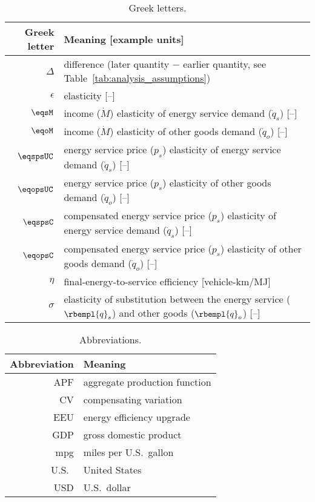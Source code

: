 
\begin{table}
\centering %
\caption{Greek letters.}
\begin{tabular}{r l}
  \toprule
  Greek letter & Meaning [example units] \\
  \midrule
  $\Delta$   & difference (later quantity $-$ earlier quantity, see Table~\ref{tab:analysis_assumptions}) \\
  $\epsilon$ & elasticity [--] \\
  $\eqsM$    & income ($\dot{M}$) elasticity of energy service demand ($\dot{q}_s$) [--] \\
  $\eqoM$    & income ($\dot{M}$) elasticity of other goods demand ($\dot{q}_o$) [--] \\
  $\eqspsUC$ & energy service price ($p_s$) elasticity of energy service demand ($\dot{q}_s$) [--] \\
  $\eqopsUC$ & energy service price ($p_s$) elasticity of other goods demand ($\dot{q}_o$) [--] \\
  $\eqspsC$   & compensated energy service price ($p_s$) elasticity of energy service demand ($\dot{q}_s$) [--] \\
  $\eqopsC$   & compensated energy service price ($p_s$) elasticity of other goods demand ($\dot{q}_o$) [--] \\
  $\eta$     & final-energy-to-service efficiency [vehicle-km/MJ] \\
  $\sigma$   & elasticity of substitution between the energy service ($\rbempl{q}_s$) and other goods ($\rbempl{q}_o$) [--] \\
  \bottomrule
\end{tabular}
\label{tab:greek}
\end{table}



\begin{table}
\centering %
\caption{Abbreviations.}
\begin{tabular}{r l}
  \toprule
  Abbreviation & Meaning \\
  \midrule
  APF & aggregate production function \\
  CV & compensating variation \\
  EEU & energy efficiency upgrade \\
  GDP & gross domestic product \\
  mpg & miles per U.S.\ gallon \\
  U.S.\ & United States \\
  USD & U.S.\ dollar \\
  \bottomrule
\end{tabular}
\label{tab:abbreviations}
\end{table}


